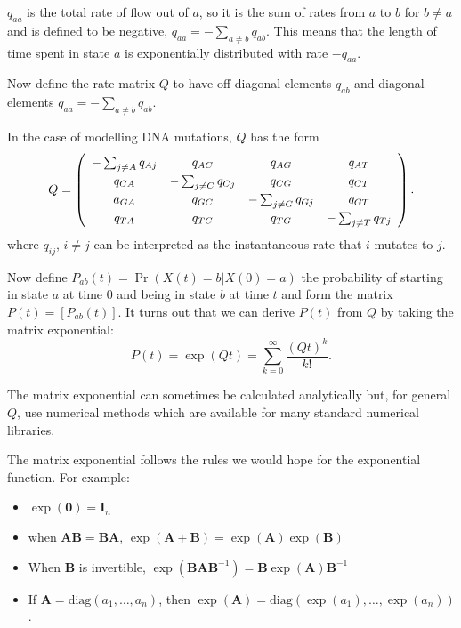 \documentclass[11pt]{article}
\begin{document}
$q_{aa}$ is  the total rate of flow out of $a$, so it is the sum of rates from $a$ to $b$ for $b \neq a$ and is defined to be negative, $q_{aa} = - \sum_{a\neq b} q_{ab}$.  This means that the length of time spent in state $a$ is exponentially distributed with rate $-q_{aa}$.

Now define the rate matrix $Q$ to have off diagonal elements $q_{ab}$ and diagonal elements $q_{aa} = - \sum_{a\neq b} q_{ab}$.  



In the case of modelling DNA mutations, $Q$ has the form
 \[ Q = 
\renewcommand{\arraystretch}{1.25}
\left(  \begin{array}{cccc}
-\sum_{j \neq A}q_{Aj} & q_{AC} &  q_{AG} &  q_{AT} \\
q_{CA} & -\sum_{j \neq C}q_{Cj}  &  q_{CG} &  q_{CT}  \\
a_{GA} & q_{GC} & -\sum_{j \neq G}q_{Gj} &  q_{GT} \\
q_{TA} &  q_{TC} &  q_{TG} & -\sum_{j \neq T}q_{Tj} 
 \end{array} \right).\] 
 where $q_{ij}$, $i \neq j$ can be interpreted as the instantaneous rate that $i$ mutates to $j$. 


Now define $P_{ab}(t) = \Pr(X(t) = b|X(0) = a)$  the probability of starting in state $a$ at time 0 and being in state $b$ at time $t$ and form the matrix $P(t) = [P_{ab}(t)]$.  It turns out that we can derive $P(t)$ from $Q$ by taking the matrix exponential:
 \[ P(t) = \exp(Q t)  = \sum_{k = 0}^{\infty}  \frac{ (Q t)^k}{k!}.  \]
 
The matrix exponential can sometimes be calculated analytically but, for general $Q$, use numerical methods which are available for many standard numerical libraries.

The matrix exponential follows the rules we would hope for the exponential function.  For example:
\begin{itemize}
\item $\exp(\mathbf 0) = \mathbf I_n$
\item when $\mathbf{AB} = \mathbf{BA}$, $\exp(\mathbf{A+B}) =\exp(\mathbf{A})\exp(\mathbf{B}) $
\item When $\mathbf B$ is invertible, $\exp(\mathbf{BAB}^{-1}) = \mathbf{B}\exp(\mathbf{A})\mathbf B^{-1}$
\item If $\mathbf A = \mathrm{diag}(a_1,\ldots,a_n)$, then $\exp(\mathbf A) = \mathrm{diag}(\exp(a_1),\ldots,\exp(a_n))$.
\end{itemize}
 
\end{document}

